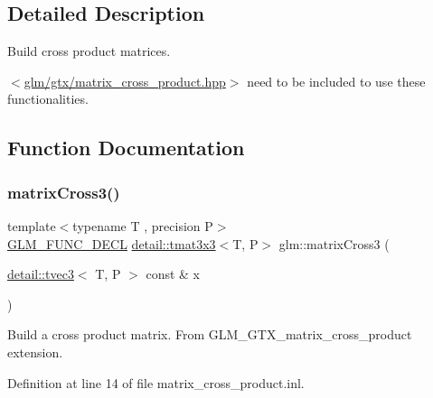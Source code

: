 \subsection{Detailed Description}
Build cross product matrices. 

$<$\hyperlink{matrix__cross__product_8hpp}{glm/gtx/matrix\+\_\+cross\+\_\+product.\+hpp}$>$ need to be included to use these functionalities. 

\subsection{Function Documentation}
\mbox{\label{group__gtx__matrix__cross__product_gaebbd4b4436b55c14b6d0b973167a25e4}} 
\subsubsection{\texorpdfstring{matrix\+Cross3()}{matrixCross3()}}
{\footnotesize\ttfamily template$<$typename T , precision P$>$ \\
\hyperlink{setup_8hpp_ab2d052de21a70539923e9bcbf6e83a51}{G\+L\+M\+\_\+\+F\+U\+N\+C\+\_\+\+D\+E\+CL} \hyperlink{structglm_1_1detail_1_1tmat3x3}{detail\+::tmat3x3}$<$T, P$>$ glm\+::matrix\+Cross3 (\begin{DoxyParamCaption}\item[{\hyperlink{structglm_1_1detail_1_1tvec3}{detail\+::tvec3}$<$ T, P $>$ const \&}]{x }\end{DoxyParamCaption})}

Build a cross product matrix. From G\+L\+M\+\_\+\+G\+T\+X\+\_\+matrix\+\_\+cross\+\_\+product extension. 

Definition at line 14 of file matrix\+\_\+cross\+\_\+product.\+inl.

\mbox{\label{group__gtx__matrix__cross__product_gab3c272adc9c9fc1f7c26d6f353b4bb4b}} 
